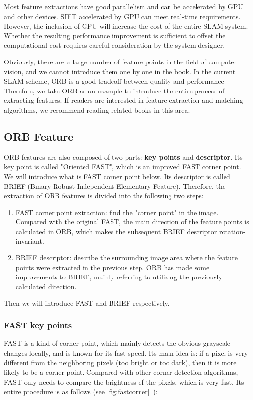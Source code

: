 Most feature extractions have good parallelism and can be accelerated by GPU and other devices. SIFT accelerated by GPU can meet real-time requirements. However, the inclusion of GPU will increase the cost of the entire SLAM system. Whether the resulting performance improvement is sufficient to offset the computational cost requires careful consideration by the system designer.

Obviously, there are a large number of feature points in the field of computer vision, and we cannot introduce them one by one in the book. In the current SLAM scheme, ORB is a good tradeoff between quality and performance. Therefore, we take ORB as an example to introduce the entire process of extracting features. If readers are interested in feature extraction and matching algorithms, we recommend reading related books in this area\cite{Nixon2012}.

\subsection{ORB Feature}

ORB features are also composed of two parts: \textbf{key points} and \textbf{descriptor}. Its key point is called "Oriented FAST", which is an improved FAST corner point. We will introduce what is FAST corner point below. Its descriptor is called BRIEF (Binary Robust Independent Elementary Feature). Therefore, the extraction of ORB features is divided into the following two steps:
\begin{enumerate}
\item FAST corner point extraction: find the "corner point" in the image. Compared with the original FAST, the main direction of the feature points is calculated in ORB, which makes the subsequent BRIEF descriptor rotation-invariant.
\item BRIEF descriptor: describe the surrounding image area where the feature points were extracted in the previous step. ORB has made some improvements to BRIEF, mainly referring to utilizing the previously calculated direction.
\end{enumerate}

Then we will introduce FAST and BRIEF respectively.
\subsubsection{FAST key points}

FAST is a kind of corner point, which mainly detects the obvious grayscale changes locally, and is known for its fast speed. Its main idea is: if a pixel is very different from the neighboring pixels (too bright or too dark), then it is more likely to be a corner point. Compared with other corner detection algorithms, FAST only needs to compare the brightness of the pixels, which is very fast. Its entire procedure is as follows (see \autoref{fig:fastcorner}~):

